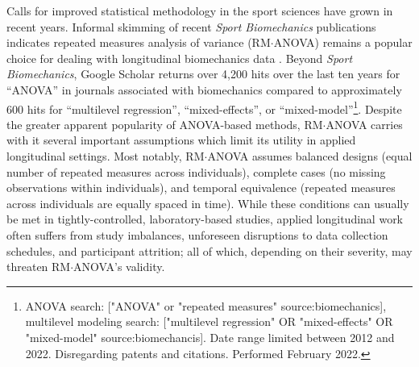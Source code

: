 \documentclass[
]{article}
\begin{document}
Calls for improved statistical methodology in the sport sciences have grown in recent years\cite{casals2017, glazier2019, halperin2018, knudson2009, knudson2017, nielsen2018, nielsen2020, sainani2020}. Informal skimming of recent \emph{Sport Biomechanics} publications indicates repeated measures analysis of variance (RM\(\cdot\)ANOVA) remains a popular choice for dealing with longitudinal biomechanics data \cite{liao2021, mueske2018, nojiri2019, stronska2020}. Beyond \emph{Sport Biomechanics}, Google Scholar returns over 4,200 hits over the last ten years for ``ANOVA'' in journals associated with biomechanics compared to approximately 600 hits for ``multilevel regression'', ``mixed-effects'', or ``mixed-model''\footnote{ANOVA search: ["ANOVA" or "repeated measures" source:biomechanics], multilevel modeling search: ["multilevel regression" OR "mixed-effects" OR "mixed-model" source:biomechancis]. Date range limited between 2012 and 2022. Disregarding patents and citations. Performed February 2022.}. Despite the greater apparent popularity of ANOVA-based methods, RM\(\cdot\)ANOVA carries with it several important assumptions which limit its utility in applied longitudinal settings. Most notably, RM\(\cdot\)ANOVA assumes balanced designs (equal number of repeated measures across individuals), complete cases (no missing observations within individuals), and temporal equivalence (repeated measures across individuals are equally spaced in time). While these conditions can usually be met in tightly-controlled, laboratory-based studies, applied longitudinal work often suffers from study imbalances, unforeseen disruptions to data collection schedules, and participant attrition; all of which, depending on their severity, may threaten RM\(\cdot\)ANOVA's validity.
\end{document}
